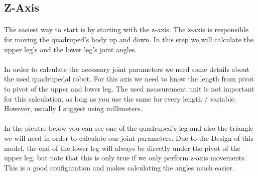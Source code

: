 \documentclass{article}
\begin{document}
    
    \subsection{Z-Axis}
    \paragraph{}
    The easiest way to start is by starting with the z-axis. The z-axis is responsible for moving the quadruped's body up and down. In this step we will calculate the upper leg's and the lower leg's joint angles.

    \paragraph{}
    In order to calculate the necessary joint parameters we need some details about the used quadrupedal robot. For this axis we need to know the length from pivot to pivot of the upper and lower leg. The used measurement unit is not important for this calculation, as long as you use the same for every length / variable. However, usually I suggest using millimeters.

    \paragraph{}
    In the picutre below you can see one of the quadruped's leg and also the triangle we will need in order to calculate our joint parameters. Due to the Design of this model, the end of the lower leg will always be directly under the pivot of the upper leg, but note that this is only true if we only perform z-axis movements. This is a good configuration and makes calculating the angles much easier.
    
\end{document}
